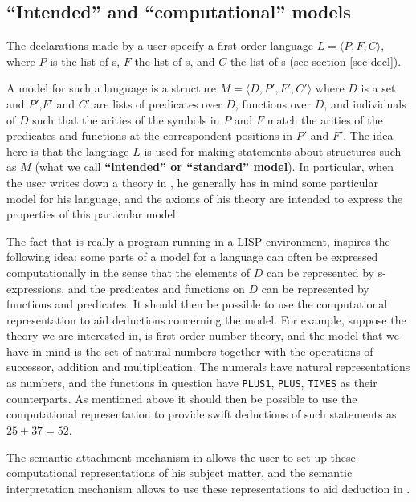 \subsection{``Intended'' and ``computational'' models}
\label{sec-ss-model}

The declarations made by a {\GF} user specify a first order language 
$L=\langle P,F,C\rangle$, where $P$ is the list of {\predconst}s, $F$ the list 
of {\funconst}s, and $C$ the list of {\indconst}s (see section \ref{sec-decl}).

A model for such a language is a structure $M=\langle D,P',F',C'\rangle$ where
$D$ is a set and $P'$,$F'$ and $C'$ are lists of predicates over $D$, functions 
over $D$, and individuals of $D$ such that the arities of the symbols in $P$ and 
$F$ match the arities of the predicates and functions at the correspondent 
positions in $P'$ and $F'$.
The idea here is that the language $L$ is used for making statements about 
structures such as $M$ (what we call {\bf ``intended'' or ``standard'' model}). 
In particular, when the user writes down a theory in {\GF}, he generally has 
in mind some particular model for his language, and the axioms of his theory 
are intended to express the properties of this particular model.

The fact that {\GF} is really a {\HG} program running in a LISP 
environment, inspires the following idea: some parts of a model for a {\GF} 
language can often be expressed computationally in the sense that the elements 
of $D$ can be represented by s-expressions, and the predicates and functions 
on $D$ can be represented by {\HG} functions and predicates.
It should then be possible to use the computational representation to aid 
{\GF} deductions concerning the model.
For example, suppose the theory we are interested in, is first order number 
theory, and the model that we have in mind is the set of natural numbers 
together with the operations of successor, addition and multiplication.
The numerals have natural representations as {\HG} numbers, and the 
functions in question have {\tt PLUS1}, {\tt PLUS}, {\tt TIMES} as their {\HG}
counterparts.
As mentioned above it should then be possible to use the computational 
representation to provide swift deductions of such statements as $25+37=52$.

The semantic attachment mechanism in {\GF} allows the user to set up these 
computational representations of his subject matter, and the semantic
interpretation mechanism allows to use these representations to aid deduction 
in {\GF}.

